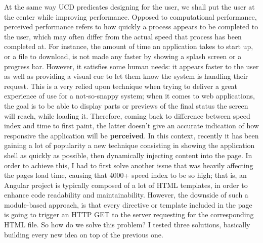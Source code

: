 \documentclass[12pt,svgnames]{memoir}
\begin{document}
At the same way UCD predicates designing for the user, we shall put the
user at the center while improving performance. Opposed to computational
performance, perceived performance refers to how quickly a process
appears to be completed to the user, which may often differ from the
actual speed that process has been completed at. For instance, the
amount of time an application takes to start up, or a file to download,
is not made any faster by showing a splash screen or a progress bar.
However, it satisfies some human needs: it appears faster to the user as
well as providing a visual cue to let them know the system is handling
their request. This is a very relied upon technique when trying to
deliver a great experience of use for a not-so-snappy system; when it
comes to web applications, the goal is to be able to display parts or
previews of the final status the screen will reach, while loading it.
Therefore, coming back to difference between speed index and time to
first paint, the latter doesn't give an accurate indication of how
responsive the application will be \textbf{perceived}. In this context,
recently it has been gaining a lot of popularity a new technique
consisting in showing the application shell as quickly as possible, then
dynamically injecting content into the page. In order to achieve this, I
had to first solve another issue that was heavily affecting the pages
load time, causing that 4000+ speed index to be so high; that is, an
Angular project is typically composed of a lot of HTML templates, in
order to enhance code readability and maintainability. However, the
downside of such a module-based approach, is that every directive or
template included in the page is going to trigger an HTTP GET to the
server requesting for the corresponding HTML file. So how do we solve
this problem? I tested three solutions, basically building every new
idea on top of the previous one.
\end{document}
